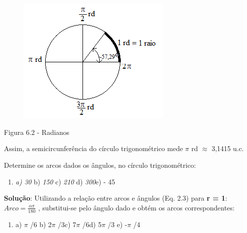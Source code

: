 \begin{figure}[H]
    \begin{Center}
        \includegraphics[width=2.96in,height=2.43in]{capitulos/trigonometria_e_funcoes_trigonometricas/media/image28.png}
    \end{Center}
\end{figure}

Figura 6.2 - Radianos

Assim, a semicircunferência do círculo trigonométrico mede $ \pi $  rd $ \approx $   3,1415 u.c.

\begin{texemplo}
Determine os arcos dados os ângulos, no círculo trigonométrico:

\begin{enumerate}
    \item \textit{a) 30\degree} \tab \tab b) \textit{150\degree } \tab c) \textit{210\degree}     \tab  d) \textit{300\degree }\tab e) - 45\degree
\end{enumerate}

\textbf{Solução}: Utilizando a relação entre arcos e ângulos (Eq. 2.3) para \textbf{r = 1}:   \( Arco=\frac{ \alpha   \pi  }{180} \)  , substitui-se   pelo ângulo dado e obtém os arcos correspondentes:

\begin{enumerate}
    \item a) $ \pi $ /6 \tab \tab b) 2$ \pi $ /3\tab \tab c) 7$ \pi $ /6\tab     \tab  d) 5$ \pi $ /3 \tab e) -$ \pi $ /4 \qedsymbol\tab 
\end{enumerate}
\end{texemplo}

